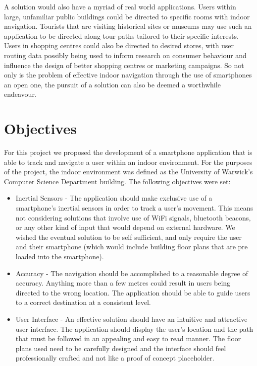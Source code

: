\documentclass[main.tex]{subfiles}
\begin{document}
A solution would also have a myriad of real world applications. Users within large, unfamiliar public buildings could be directed to specific rooms with indoor navigation. Tourists that are visiting historical sites or museums may use such an application to be directed along tour paths tailored to their specific interests. Users in shopping centres could also be directed to desired stores, with user routing data possibly being used to inform research on consumer behaviour and influence the design of better shopping centres or marketing campaigns. So not only is the problem of effective indoor navigation through the use of smartphones an open one, the pursuit of a solution can also be deemed a worthwhile endeavour.

\section{Objectives}

For this project we proposed the development of a smartphone application that is able to track and navigate a user within an indoor environment. For the purposes of the project, the indoor environment was defined as the University of Warwick's Computer Science Department building. The following objectives were set:\\

\begin{itemize}
\item Inertial Sensors - The application should make exclusive use of a smartphone's inertial sensors in order to track a user's movement. This means not considering solutions that involve use of WiFi signals, bluetooth beacons, or any other kind of input that would depend on external hardware. We wished the eventual solution to be self sufficient, and only require the user and their smartphone (which would include building floor plans that are pre loaded into the smartphone).

\item Accuracy - The navigation should be accomplished to a reasonable degree of accuracy. Anything more than a few metres could result in users being directed to the wrong location. The application should be able to guide users to a correct destination at a consistent level.

\item User Interface - An effective solution should have an intuitive and attractive user interface. The application should display the user's location and the path that must be followed in an appealing and easy to read manner. The floor plans used need to be carefully designed and the interface should feel professionally crafted and not like a proof of concept placeholder.

\end{itemize}
\end{document}
